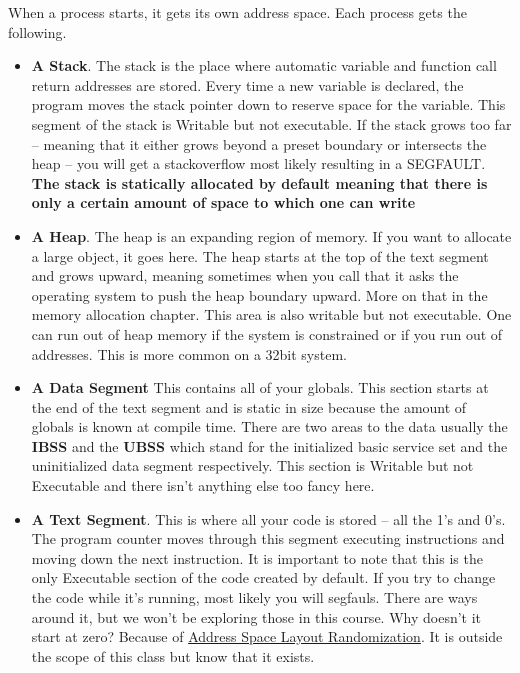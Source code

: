 When a process starts, it gets its own address space. Each process gets the following.
\begin{itemize}
\item \textbf{A Stack}. The stack is the place where automatic variable and function call return addresses are stored. Every time a new variable is declared, the program moves the stack pointer down to reserve space for the variable. This segment of the stack is Writable but not executable. If the stack grows too far -- meaning that it either grows beyond a preset boundary or intersects the heap -- you will get a stackoverflow most likely resulting in a SEGFAULT. \textbf{The stack is statically allocated by default meaning that there is only a certain amount of space to which one can write} 
\item \textbf{A Heap}. The heap is an expanding region of memory. If you want to allocate a large object, it goes here. The heap starts at the top of the text segment and grows upward, meaning sometimes when you call  that it asks the operating system to push the heap boundary upward. More on that in the memory allocation chapter. This area is also writable but not executable. One can run out of heap memory if the system is constrained or if you run out of addresses. This is more common on a 32bit system. 
\item \textbf{A Data Segment} This contains all of your globals. This section starts at the end of the text segment and is static in size because the amount of globals is known at compile time. There are two areas to the data usually the \textbf{IBSS} and the \textbf{UBSS} which stand for the initialized basic service set and the uninitialized data segment respectively. This section is Writable but not Executable and there isn't anything else too fancy here. 
\item \textbf{A Text Segment}. This is where all your code is stored -- all the 1's and 0's. The program counter moves through this segment executing instructions and moving down the next instruction. It is important to note that this is the only Executable section of the code created by default. If you try to change the code while it's running, most likely you will segfauls. There are ways around it, but we won't be exploring those in this course. Why doesn't it start at zero? Because of \href{https://en.wikipedia.org/wiki/Address_space_layout_randomization}{Address Space Layout Randomization}. It is outside the scope of this class but know that it exists.
\end{itemize}

